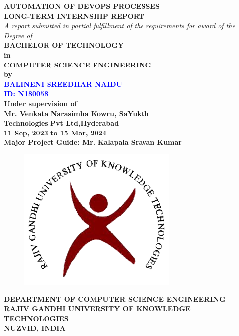 \documentclass[12pt,a4paper,oneside]{report}
\date{}
\begin{document}
\thispagestyle{empty}
\begin{center}
{\Large  \MakeUppercase{\bf Automation of DevOps Processes}\\} 
\vspace{0.8cm}
{\Large  \MakeUppercase{\bf Long-Term Internship Report}\\}
\doublespacing
\vspace*{2.5cm}
{\normalsize \it A report submitted in partial fulfillment of the requirements for award of the Degree of\\
}
{\bf BACHELOR OF TECHNOLOGY }\\
{\bf in }\\
{\bf COMPUTER SCIENCE ENGINEERING }\\
{\bf by }\\
\vspace*{1cm}
{\bf\textcolor{blue} {BALINENI SREEDHAR NAIDU }}\\
{\bf \textcolor{blue}{ID: N180058}} \\
{\bf Under supervision of }\\
{\bf Mr. Venkata Narasimha Kowru, SaYukth}\\
{\bf Technologies Pvt Ltd,Hyderabad} \\
{\bf 11 Sep, 2023 to 15 Mar, 2024} \\ 
{\bf Major Project Guide: Mr. Kalapala Sravan Kumar } \\

\vspace*{0.8cm}
\begin{figure}[hbt]
\centering
\vspace*{0.6cm}
\centerline{\includegraphics[scale=0.29]{images/rgukt.png}}
\end{figure}
\vspace*{0.3cm}
{\small \bf DEPARTMENT OF COMPUTER SCIENCE ENGINEERING}\\
{\small \bf RAJIV GANDHI UNIVERSITY OF KNOWLEDGE TECHNOLOGIES}\\
{\small \bf NUZVID, INDIA\\ }
\end{center}
\end{document}
